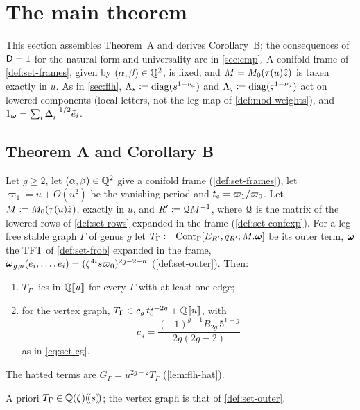 \section{The main theorem}
\label{sec:mai}

This section assembles Theorem~A and derives Corollary~B; the consequences of $\mathsf{D}=1$ for the natural form and universality are in \cref{sec:cmp}. A conifold frame of \cref{def:set-frames}, given by $(\alpha,\beta)\in\mathbb{Q}^2$, is fixed, and $M=M_{0}(\tau(u)\hat{z})$ is taken exactly in $u$. As in \cref{sec:flh}, $\Lambda_s\coloneqq\operatorname{diag}(s^{1-\nu_a})$ and $\Lambda_\varsigma\coloneqq\operatorname{diag}(\varsigma^{1-\nu_a})$ act on lowered components (local letters, not the leg map of \cref{def:mod-weights}), and $1_{\boldsymbol{\omega}}=\sum_i\Delta_i^{-1/2}\tilde e_i$.

\subsection{Theorem A and Corollary B}
\label{sec:mai-thm}

\begin{thm}[Theorem A]
\label{thm:mai-main}
Let $g\geq2$, let $(\alpha,\beta)\in\mathbb{Q}^2$ give a conifold frame (\cref{def:set-frames}), let $\varpi_1=u+O(u^2)$ be the vanishing period and $t_{\mathrm{c}}=\varpi_1/\varpi_0$. Let $M\coloneqq M_{0}(\tau(u)\hat{z})$, exactly in $u$, and $R'\coloneqq\mathcal{Q} M^{-1}$, where $\mathcal{Q}$ is the matrix of the lowered rows of \cref{def:set-rows} expanded in the frame (\cref{def:set-confexp}). For a leg-free stable graph $\Gamma$ of genus $g$ let $T_\Gamma\coloneqq\mathrm{Cont}_\Gamma[E_{R'},q_{R'};M.\boldsymbol{\omega}]$ be its outer term, $\boldsymbol{\omega}$ the TFT of \cref{def:set-frob} expanded in the frame, $\boldsymbol{\omega}_{g,n}(\tilde e_i,\dots,\tilde e_i)=(\zeta^{4i}s\varpi_0)^{2g-2+n}$ (\cref{def:set-outer}). Then:
\begin{enumerate}
\item $T_\Gamma$ lies in $\mathbb{Q}[\![ u ]\!]$ for every $\Gamma$ with at least one edge;
\item for the vertex graph, $T_\Gamma\in c_g\,t_{\mathrm{c}}^{2-2g}+\mathbb{Q}[\![ u ]\!]$, with
\[
c_g=\frac{(-1)^{g-1}B_{2g}\,5^{1-g}}{2g(2g-2)}
\]
as in \eqref{eq:set-cg}.
\end{enumerate}
The hatted terms are $G_\Gamma=u^{2g-2}T_\Gamma$ (\cref{lem:flh-hat}).
\end{thm}

A priori $T_\Gamma\in\mathbb{Q}(\zeta)(\!(s)\!)$; the vertex graph is that of \cref{def:set-outer}.

